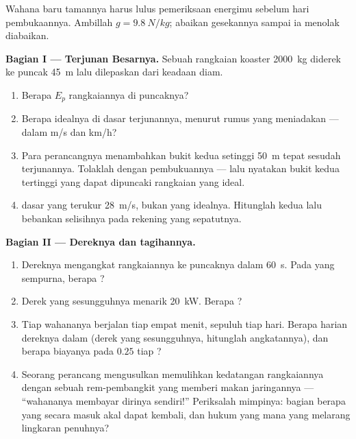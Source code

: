 \begin{problem}\label{pb:g9:energy-conversions:1}
Wahana baru tamannya harus lulus pemeriksaan energimu sebelum hari
pembukaannya. Ambillah $g = \qty{9.8}{N/kg}$; abaikan gesekannya
sampai ia menolak diabaikan.

\medskip\noindent\textbf{Bagian I --- Terjunan Besarnya.}
Sebuah rangkaian koaster \qty{2000}{kg} diderek ke puncak \qty{45}{m}
lalu dilepaskan dari keadaan diam.
\begin{enumerate}
  \item Berapa $E_p$ rangkaiannya di puncaknya?
  \item Berapa  idealnya di dasar terjunannya, menurut rumus
        yang meniadakan  --- dalam \unit{m/s} dan
        \unit{km/h}?
  \item Para perancangnya menambahkan bukit kedua setinggi \qty{50}{m}
        tepat sesudah terjunannya. Tolaklah dengan pembukuannya ---
        lalu nyatakan bukit kedua tertinggi yang dapat dipuncaki
        rangkaian yang ideal.
  \item {} dasar yang terukur \qty{28}{m/s}, bukan yang
        idealnya. Hitunglah kedua  lalu bebankan
        selisihnya pada rekening yang sepatutnya.
\end{enumerate}

\medskip\noindent\textbf{Bagian II --- Dereknya dan
tagihannya.}
\begin{enumerate}[resume]
  \item Dereknya mengangkat rangkaiannya ke puncaknya dalam
        \qty{60}{s}. Pada  yang sempurna, berapa ?
  \item Derek yang sesungguhnya menarik \qty{20}{kW}. Berapa
        ?
  \item Tiap wahananya berjalan tiap empat menit, sepuluh  tiap
        hari. Berapa  harian dereknya dalam  (derek
        yang sesungguhnya, hitunglah angkatannya), dan berapa biayanya
        pada $0.25$ tiap ?
  \item Seorang perancang mengusulkan memulihkan  kedatangan
        rangkaiannya dengan sebuah rem-pembangkit yang memberi makan
        jaringannya --- ``wahananya membayar dirinya sendiri!''
        Periksalah mimpinya: bagian berapa yang secara masuk akal
        dapat kembali, dan hukum yang mana yang melarang lingkaran
        penuhnya?
\end{enumerate}


\end{problem}
